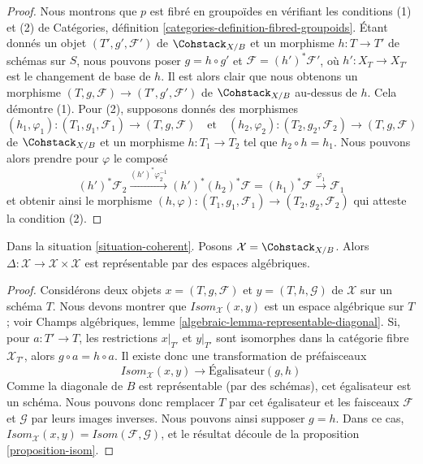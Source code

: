\begin{proof}
Nous montrons que $p$ est fibré en groupoïdes en vérifiant les conditions (1)
et (2) de Catégories, définition
\ref{categories-definition-fibred-groupoids}. Étant donnés un objet
$(T', g', \mathcal{F}')$ de $\Cohstack_{X/B}$ et un morphisme
$h : T \to T'$ de schémas sur $S$, nous pouvons poser $g = h \circ g'$ et
$\mathcal{F} = (h')^*\mathcal{F}'$, où $h' : X_T \to X_{T'}$ est le
changement de base de $h$. Il est alors clair que nous obtenons un morphisme
$(T, g, \mathcal{F}) \to (T', g', \mathcal{F}')$ de $\Cohstack_{X/B}$
au-dessus de $h$. Cela démontre (1). Pour (2), supposons donnés des morphismes
$$
(h_1, \varphi_1) : (T_1, g_1, \mathcal{F}_1) \to (T, g, \mathcal{F})
\quad\text{et}\quad
(h_2, \varphi_2) : (T_2, g_2, \mathcal{F}_2) \to (T, g, \mathcal{F})
$$
de $\Cohstack_{X/B}$ et un morphisme $h : T_1 \to T_2$ tel que
$h_2 \circ h = h_1$. Nous pouvons alors prendre pour $\varphi$ le composé
$$
(h')^*\mathcal{F}_2
\xrightarrow{(h')^*\varphi_2^{-1}}
(h')^*(h_2)^*\mathcal{F} = (h_1)^*\mathcal{F}
\xrightarrow{\varphi_1}
\mathcal{F}_1
$$
et obtenir ainsi le morphisme
$(h, \varphi) : (T_1, g_1, \mathcal{F}_1) \to (T_2, g_2, \mathcal{F}_2)$
qui atteste la condition (2).
\end{proof}

\begin{lemma}
\label{lemma-coherent-diagonal}
Dans la situation \ref{situation-coherent}. Posons
$\mathcal{X} = \Cohstack_{X/B}$. Alors
$\Delta : \mathcal{X} \to \mathcal{X} \times \mathcal{X}$ est représentable
par des espaces algébriques.
\end{lemma}

\begin{proof}
Considérons deux objets $x = (T, g, \mathcal{F})$ et
$y = (T, h, \mathcal{G})$ de $\mathcal{X}$ sur un schéma $T$. Nous devons
montrer que $\mathit{Isom}_\mathcal{X}(x, y)$ est un espace algébrique sur
$T$ ; voir Champs algébriques, lemme
\ref{algebraic-lemma-representable-diagonal}. Si, pour $a : T' \to T$, les
restrictions $x|_{T'}$ et $y|_{T'}$ sont isomorphes dans la catégorie fibre
$\mathcal{X}_{T'}$, alors $g \circ a = h \circ a$. Il existe donc une
transformation de préfaisceaux
$$
\mathit{Isom}_\mathcal{X}(x, y) \longrightarrow \text{Égalisateur}(g, h)
$$
Comme la diagonale de $B$ est représentable (par des schémas), cet égalisateur
est un schéma. Nous pouvons donc remplacer $T$ par cet égalisateur et les
faisceaux $\mathcal{F}$ et $\mathcal{G}$ par leurs images inverses. Nous
pouvons ainsi supposer $g = h$. Dans ce cas,
$\mathit{Isom}_\mathcal{X}(x, y) = \mathit{Isom}(\mathcal{F}, \mathcal{G})$,
et le résultat découle de la proposition \ref{proposition-isom}.
\end{proof}

